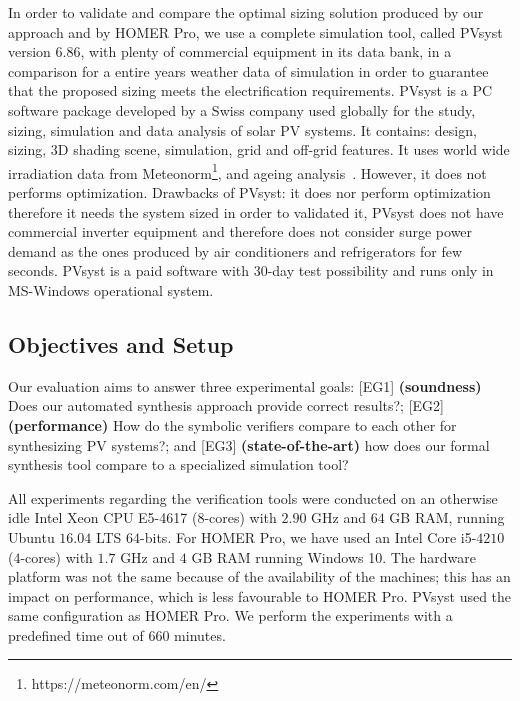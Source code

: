 \documentclass[runningheads]{llncs}
\begin{document}
In order to validate and compare the optimal sizing solution produced by our approach and by HOMER Pro, we use a complete simulation tool, called PVsyst version $6.86$, with plenty of commercial equipment in its data bank, in a comparison for a entire years weather data of simulation in order to guarantee that the proposed sizing meets the electrification requirements. PVsyst is a PC software package developed by a Swiss company used globally for the study, sizing, simulation and data analysis of solar PV systems. It contains: design, sizing, 3D shading scene, simulation, grid and off-grid features. It uses world wide irradiation data from Meteonorm\footnote{https://meteonorm.com/en/}, and ageing analysis~\cite{PVsyst2017}. However, it does not performs optimization. Drawbacks of PVsyst: it does nor perform optimization therefore it needs the system sized in order to validated it, PVsyst does not have commercial inverter equipment and therefore does not consider surge power demand as the ones produced by air conditioners and refrigerators for few seconds. PVsyst is a paid software with $30$-day test possibility and runs only in MS-Windows operational system.

\subsection{Objectives and Setup}
Our evaluation aims to answer three experimental goals: [EG1] \textbf{(soundness)} Does our automated synthesis approach provide correct results?; [EG2] \textbf{(performance)} How do the symbolic verifiers compare to each other for synthesizing PV systems?; and [EG3] \textbf{(state-of-the-art)} how does our formal synthesis tool compare to a specialized simulation tool?

All experiments regarding the verification tools were conducted on an otherwise idle Intel Xeon CPU E5-4617 ($8$-cores) with $2.90$ GHz and $64$ GB RAM, running Ubuntu $16.04$ LTS $64$-bits. For HOMER Pro, we have used an Intel Core i5-$4210$ ($4$-cores) with $1.7$ GHz and $4$ GB RAM running Windows 10. The hardware platform was not the same because of the availability of the machines; this has an impact on performance, which is less favourable to HOMER Pro. PVsyst used the same configuration as HOMER Pro. We perform the experiments with a predefined time out of $660$ minutes.
\end{document}
